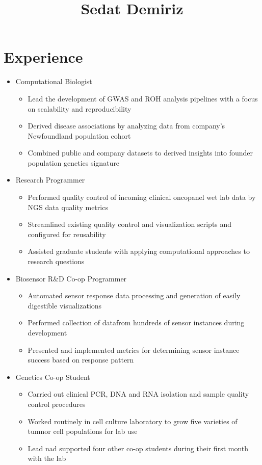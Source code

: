 \documentclass{article}
\title{Sedat Demiriz}
\begin{document}
  \maketitle

\section{Experience}
\begin{itemize}
  \item Computational Biologist
    \begin{itemize}
      \item Lead the development of GWAS and ROH analysis pipelines with a focus on scalability and reproducibility
      \item Derived disease associations by analyzing data from company's Newfoundland population cohort
      \item Combined public and company datasets to derived insights into founder population genetics signature
    \end{itemize}
  \item Research Programmer
    \begin{itemize}
      \item Performed quality control of incoming clinical oncopanel wet lab data by NGS data quality metrics
      \item Streamlined existing quality control and visualization scripts and configured for reusability
      \item Assisted graduate students with applying computational approaches to research questions
    \end{itemize}
  \item Biosensor R\&D Co-op Programmer
    \begin{itemize}
      \item Automated sensor response data processing and generation of easily digestible visualizations
      \item Performed collection of datafrom hundreds of sensor instances during development
      \item Presented and implemented metrics for determining sensor instance success based on response pattern
    \end{itemize}
  \item Genetics Co-op Student
    \begin{itemize}
      \item Carried out clinical PCR, DNA and RNA isolation and sample quality control procedures
      \item Worked routinely in cell culture laboratory to grow five varieties of tumnor cell populations for lab use
      \item Lead nad supported four other co-op students during their first month with the lab
    \end{itemize}
\end{itemize}
\end{document}

